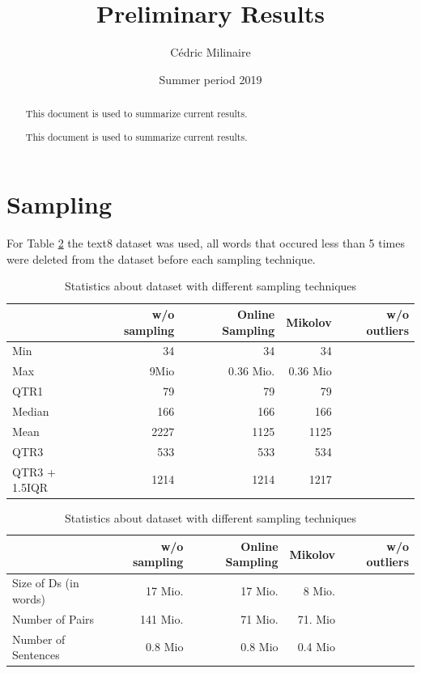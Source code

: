 \documentclass{scrartcl}
\title{Preliminary Results}
\author{Cédric Milinaire}
\date{Summer period 2019}
\begin{document}
\begin{titlepage}
\maketitle
\end{titlepage} 
 \begin{abstract}
     This document is used to summarize current results. 
 \end{abstract}
\listoffigures
\listoftables
\newpage
 \begin{abstract}
     This document is used to summarize current results. 
 \end{abstract}
\section{Sampling}
For Table \ref{tab:sampling_stats} the text8 dataset was used, all words that occured less than 5 times were deleted from the dataset before each sampling technique.

\begin{table}[h]\centering
    \caption{Statistics about dataset with different sampling techniques}
    \begin{tabular}{l r r r r}%
        \toprule
      &    \textbf{w/o sampling} & \textbf{Online Sampling} & \textbf{Mikolov} & \textbf{w/o outliers}  \\%
        \midrule%
        Min     &   34 & 34 & 34 & \\%
       Max    & 9Mio & 0.36 Mio. & 0.36 Mio & \\%
      	QTR1      & 79 & 79 & 79\\%
         Median &166 & 166 & 166 & \\%
         Mean & 2227 & 1125 & 1125 & \\%
       QTR3     & 533 & 533 & 534 & \\%
       QTR3 + 1.5IQR   & 1214 & 1214 & 1217  \\%
        \bottomrule%
   \end{tabular}%
   \label{tab:stats_pairs}%
\end{table}
\begin{table}[h]\centering
    \caption{Statistics about dataset with different sampling techniques}
    \begin{tabular}{l r r r r}%
        \toprule
      &    \textbf{w/o sampling} & \textbf{Online Sampling} & \textbf{Mikolov} & \textbf{w/o outliers}  \\%
        \midrule%
        Size of Ds   (in words)     &  17 Mio.& 17 Mio. & 8 Mio.& \\%
        Number of Pairs       & 141 Mio. & 71 Mio. & 71. Mio & \\%
        Number of Sentences         & 0.8 Mio & 0.8 Mio & 0.4 Mio  \\%
        \bottomrule%
   \end{tabular}%
   \label{tab:sampling_stats}%
\end{table}
\newpage
\end{document}
